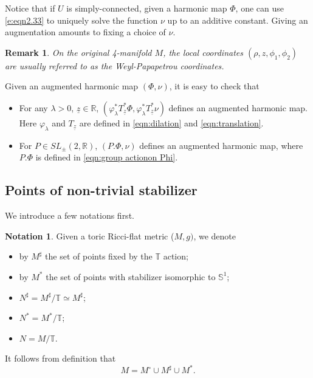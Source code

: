\documentclass[a4paper,11pt]{amsart}
\newtheorem{remark}[theorem]{Remark}
\theoremstyle{definition}
\newtheorem{notation}[theorem]{Notation}
\numberwithin{equation}{section}
\newcommand{\dT}{\mathbb{T}}
\newcommand{\dS}{\mathbb{S}}
\begin{document}
Notice that if  $U$ is simply-connected, given a harmonic map $\Phi$, one can use \eqref{e:eqn2.33} to uniquely solve the function $\nu$ up to an additive constant. Giving an augmentation  amounts to fixing a choice of $\nu$.  






\begin{remark}
  On the original 4-manifold $M$, the local coordinates $(\rho, z, \phi_1, \phi_2)$ are usually referred to as the {Weyl-Papapetrou} coordinates.
\end{remark}


Given an augmented harmonic map $(\Phi, \nu)$,  it is easy to check that 

\begin{itemize}
	\item  For any $\lambda>0$, $\underline z\in \mathbb R$, $(\varphi_\lambda^*T_{\underline z}^*\Phi, \varphi_\lambda^*T_{\underline z}^*\nu)$  defines an augmented harmonic map. Here $\varphi_\lambda$ and $T_{\underline z}$ are defined in \eqref{eqn:dilation} and \eqref{eqn:translation}.
	\item For $P \in SL_{\pm}(2,\mathbb{R})$, $(P. \Phi, \nu)$  defines an augmented harmonic map, where $P.\Phi$ is defined in \eqref{eqn:group actionon Phi}.
\end{itemize}


\subsection{Points of non-trivial stabilizer}\label{ss:nuts and bolts}

We introduce a few notations first. 

\begin{notation}
	Given a toric Ricci-flat metric ($M,g)$, we denote 
	\begin{itemize}
		\item by $M^\sharp$ the set of points fixed by the $\dT$ action;
		\item by $M^{*}$ the set of points with stabilizer isomorphic to $\dS^1$; 
        	\item $N^\sharp=M^\sharp/\dT\simeq M^\sharp$;
		\item $N^*=M^*/\dT$;
		\item $N=M/\dT$.
	\end{itemize} 
\end{notation}
It follows from definition that 
$$M=M^\circ\cup M^\sharp\cup M^*.$$
\end{document}
